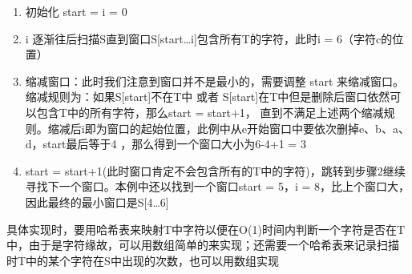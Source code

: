 \documentclass[12pt]{book}
\begin{document}
\begin{enumerate}
\item 初始化 start = i = 0

\item i 逐渐往后扫描S直到窗口S[start…i]包含所有T的字符，此时i = 6（字符c的位置）

\item 缩减窗口：此时我们注意到窗口并不是最小的，需要调整 start 来缩减窗口。缩减规则为：如果S[start]不在T中 或者 S[start]在T中但是删除后窗口依然可以包含T中的所有字符，那么start = start+1， 直到不满足上述两个缩减规则。缩减后i即为窗口的起始位置，此例中从e开始窗口中要依次删掉e、b、a、d，start最后等于4 ，那么得到一个窗口大小为6-4+1 = 3

\item start = start+1(此时窗口肯定不会包含所有的T中的字符)，跳转到步骤2继续寻找下一个窗口。本例中还以找到一个窗口start = 5，i = 8，比上个窗口大，因此最终的最小窗口是S[4…6]
\end{enumerate}

具体实现时，要用哈希表来映射T中字符以便在O(1)时间内判断一个字符是否在T
中，由于是字符缘故，可以用数组简单的来实现；还需要一个哈希表来记录扫描
时T中的某个字符在S中出现的次数，也可以用数组实现
\end{document}
